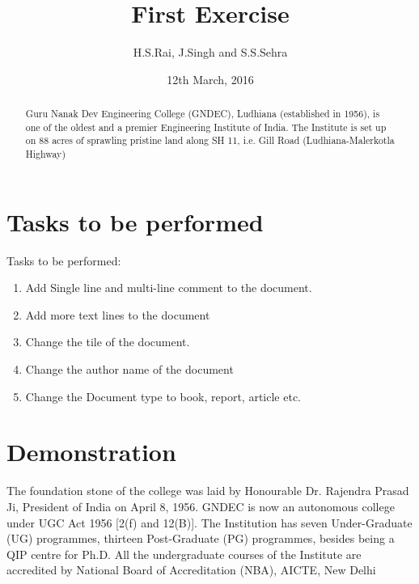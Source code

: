 \documentclass[12pt, letterpaper, twoside]{article}
\title{First Exercise}
\author{H.S.Rai, J.Singh and S.S.Sehra}
\date{12th March, 2016}
\begin{document}
\maketitle
\section*{Tasks to be performed}
Tasks to be performed:
\begin{enumerate}
	\item Add Single line and multi-line comment to the document.
    \item Add more text lines to the document
    \item Change the tile of the document.
   \item Change the author name of the document
   \item Change the Document type to book, report, article etc.
\end{enumerate}
\section*{Demonstration}


\begin{abstract}
Guru Nanak Dev Engineering College (GNDEC), Ludhiana (established in
1956), is one of the oldest and a premier Engineering Institute of India. The
Institute is set up on 88 acres of sprawling pristine land along SH 11, i.e. Gill
Road (Ludhiana-Malerkotla Highway)
\end{abstract}

 The foundation stone of the college
 was laid by Honourable Dr. Rajendra Prasad Ji, President of India on April 8,
 1956. GNDEC is now an autonomous college under UGC Act 1956 [2(f) and
 12(B)]. The Institution has seven Under-Graduate (UG) programmes,
 thirteen Post-Graduate (PG) programmes, besides being a QIP centre for
 Ph.D. All the undergraduate courses of the Institute are accredited by
 National Board of Accreditation (NBA), AICTE, New Delhi
 
\begin{comment}
This text won't show up in the compiled pdf
this is just a multi-line comment. Useful
to, for instance, comment out slow-rendering
while working on the draft.
\end{comment}
\end{document}
